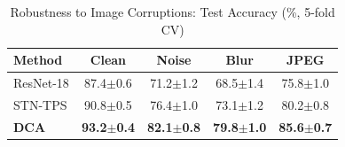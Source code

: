 \begin{table}[t]
\centering
\caption{Robustness to Image Corruptions: Test Accuracy (\%, 5-fold CV)}
\label{tab:robustness}
\begin{tabularx}{\textwidth}{Xcccc}
\hline
\textbf{Method} & \textbf{Clean} & \textbf{Noise} & \textbf{Blur} & \textbf{JPEG} \\
\hline
ResNet-18 & 87.4$\pm$0.6 & 71.2$\pm$1.2 & 68.5$\pm$1.4 & 75.8$\pm$1.0 \\
STN-TPS & 90.8$\pm$0.5 & 76.4$\pm$1.0 & 73.1$\pm$1.2 & 80.2$\pm$0.8 \\
\textbf{DCA} & \textbf{93.2$\pm$0.4} & \textbf{82.1$\pm$0.8} & \textbf{79.8$\pm$1.0} & \textbf{85.6$\pm$0.7} \\
\hline
\end{tabularx}
\end{table}
